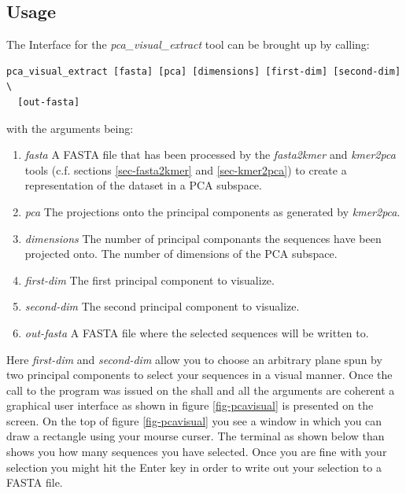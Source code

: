 \subsection{Usage}
The Interface for the \emph{pca\_visual\_extract} tool can be brought
up by calling:
\begin{lstlisting}
pca_visual_extract [fasta] [pca] [dimensions] [first-dim] [second-dim] \
  [out-fasta]
\end{lstlisting}
with the arguments being:
\begin{enumerate}
  \item \emph{fasta} A FASTA file that has been processed by the
    \emph{fasta2kmer} and \emph{kmer2pca} tools (c.f. sections
    \ref{sec-fasta2kmer} and \ref{sec-kmer2pca}) to create a
    representation of the dataset in a PCA subspace.
  \item \emph{pca} The projections onto the principal components as
    generated by \emph{kmer2pca}.
  \item \emph{dimensions} The number of principal componants the
    sequences have been projected onto. The number of dimensions of
    the PCA subspace.
  \item \emph{first-dim} The first principal component to visualize.
  \item \emph{second-dim} The second principal component to visualize.
  \item \emph{out-fasta} A FASTA file where the selected sequences
    will be written to. 
\end{enumerate}
Here \emph{first-dim} and \emph{second-dim} allow you to choose an
arbitrary plane spun by two principal components to select your
sequences in a visual manner. Once the call to the program was issued
on the shall and all the arguments are coherent a graphical user
interface as shown in figure \ref{fig-pcavisual} is presented on the
screen. On the top of figure \ref{fig-pcavisual} you see a
window in which you can draw a rectangle using your mourse
curser. The terminal as shown below than shows you how many
sequences you have selected. Once you are fine with your
selection you might hit the Enter key in order to write out your
selection to a FASTA file.
